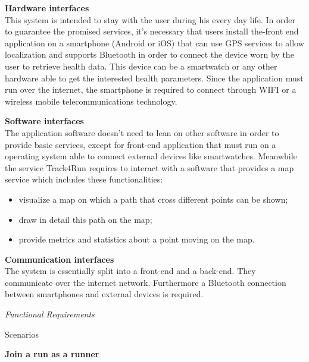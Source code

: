 \documentclass{article}
\begin{document}
\begin{legal}
\begin{legal}
\begin{legal}
			\item \textbf{Hardware interfaces}\\
This system is intended to stay with the user during his every day life. In order to guarantee the promised services, it’s necessary that users install the-front end application on a smartphone (Android or iOS) that can use GPS services to allow localization and supports Bluetooth in order to connect the device worn by the user to retrieve health data. This device can be a smartwatch or any other hardware able to get the interested health parameters.
Since the application must run over the internet, the smartphone is required to connect through WIFI or a wireless mobile telecommunications technology.\\
			\item \textbf{Software interfaces}\\
The application software doesn’t need to lean on other software in order to provide basic services, except for front-end application that must run on a operating system able to connect external devices like smartwatches. 
Meanwhile the service Track4Run requires to interact with a software that provides a map service which includes these functionalities:
				\begin{itemize}
				\item visualize a map on which a path that cross different points can be shown;
				\item draw in detail this path on the map;
				\item provide metrics and statistics about a point moving on the map.\\
				\end{itemize}
			\item \textbf{Communication interfaces}\\
The system is essentially split into a front-end and a back-end. They communicate over the internet network.
Furthermore a Bluetooth connection between smartphones and external devices is required.\\
			\end{legal}
    		\item \textit{Functional Requirements}\\
    		\begin{legal}
		\item Scenarios\\
		{\normalfont
		\begin{legal}
		\item \textbf{Join a run as a runner}\\


\end{legal}}
\end{legal}
\end{legal}
\end{legal}
\end{document}
